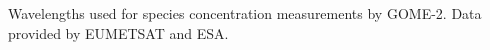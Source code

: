 \label{fig:gomeproducts}
Wavelengths used for species concentration measurements by GOME-2. Data provided by EUMETSAT and ESA.